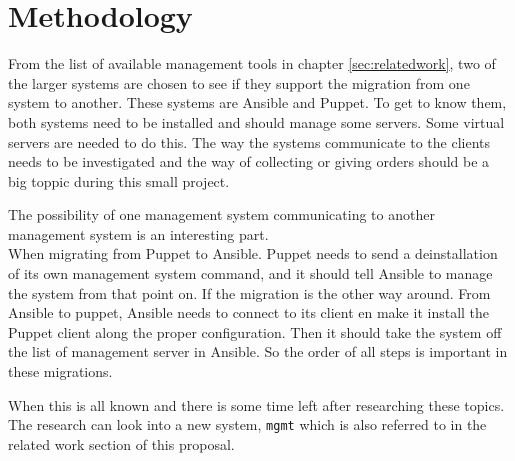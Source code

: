 \section{Methodology}\label{sec:method}
From the list of available management tools in chapter \ref{sec:relatedwork}, two of the larger systems are chosen to see if they support the migration from one system to another. These systems are Ansible\cite{whatisansible} and Puppet\cite{whatispuppet}. To get to know them, both systems need to be installed and should manage some servers. Some virtual servers are needed to do this. The way the systems communicate to the clients needs to be investigated and the way of collecting or giving orders should be a big toppic during this small project. 

The possibility of one management system communicating to another management system is an interesting part. \\
When migrating from Puppet to Ansible. Puppet needs to send a deinstallation of its own management system command, and it should tell Ansible to manage the system from that point on. If the migration is the other way around. From Ansible to puppet, Ansible needs to connect to its client en make it install the Puppet client along the proper configuration. Then it should take the system off the list of management server in Ansible. So the order of all steps is important in these migrations. 

When this is all known and there is some time left after researching these topics. The research can look into a new system, \texttt{mgmt} which is also referred to in the related work section of this proposal.

